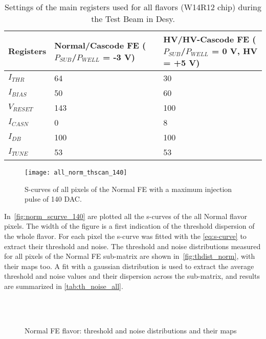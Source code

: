 \begin{table}[h!]
\centering
\begin{tabular}{C{3.2cm}|C{3.7cm}|C{3.5cm}}
\hline
Registers & Normal/Cascode FE ($P_{SUB}$/$P_{WELL}$ = -3 V) & HV/HV-Cascode FE ($P_{SUB}$/$P_{WELL}$ = 0 V, HV = +5 V)\\[2ex]
\hline
\hline
$I_{THR}$ & 64 & 30\\[0.5ex]
\hline
$I_{BIAS}$ & 50 & 60\\
\hline
$V_{RESET}$ & 143 & 100\\
\hline
$I_{CASN}$ & 0 & 8\\
\hline
$I_{DB}$ & 100 & 100\\
\hline
$I_{TUNE}$ & 53 & 53\\
\hline
\hline
\end{tabular}
\caption{Settings of the main registers used for all flavors (W14R12 chip) during the Test Beam in Desy.}
\label{tab:tb_settings}
\end{table}


\begin{figure}[h!]
\centering
\texttt{[image: all\_norm\_thscan\_140]}
\caption{S-curves of all pixels of the Normal FE with a maximum injection pulse of 140 DAC.}
\label{fig:norm_scurve_140}
\end{figure}


In~\autoref{fig:norm_scurve_140} are plotted all the s-curves of the all Normal flavor pixels. The width of the figure is a first indication of the threshold dispersion of the whole flavor.
For each pixel the s-curve was fitted with the \autoref{eq:s-curve} to extract their threshold and noise.  
The threshold and noise distributions measured for all pixels of the Normal FE sub-matrix are shown in~\autoref{fig:thdist_norm},  with their maps too. A fit with a gaussian distribution is used to extract the average threshold and noise values and their dispersion across the sub-matrix, and results are summarized in \autoref{tab:th_noise_all}.

\begin{figure}[h!]
\centering
{}\quad
{}\\
\quad
{}\\
\caption{Normal FE flavor: threshold and noise distributions and their maps}
\label{fig:thdist_norm}
\end{figure}



